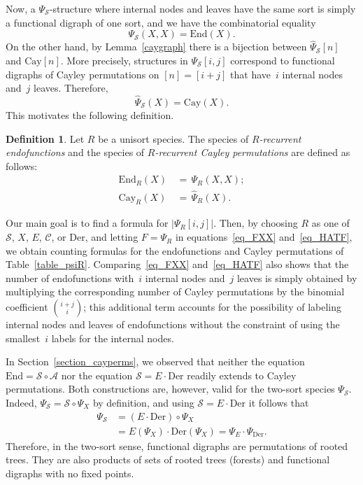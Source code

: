 \documentclass[a4paper,11pt,UKenglish]{article}
\newcommand{\Set}{E}
\newcommand{\Sym}{\mathcal{S}}
\newcommand{\End}{\mathrm{End}}
\newcommand{\Cyc}{\mathcal{C}}
\newcommand{\Der}{\mathrm{Der}}
\newcommand{\rtree}{\mathcal{A}}
\newcommand{\Cay}{\mathrm{Cay}}
\theoremstyle{definition}
\newtheorem{definition}[theorem]{Definition}
\begin{document}
Now, a $\Psi_{\Sym}$-structure where internal nodes and leaves
have the same sort is simply a functional digraph of one sort, and
we have the combinatorial equality
$$
\Psi_{\Sym}(X,X)=\End(X).
$$
On the other hand, by Lemma~\ref{caygraph}
there is a bijection between $\widehat{\Psi}_{\Sym}[n]$
and $\Cay[n]$. More precisely, structures in $\Psi_{\Sym}[i,j]$
correspond to functional digraphs of Cayley permutations on
$[n]=[i+j]$ that have~$i$ internal nodes and~$j$ leaves.
Therefore,
$$
\widehat{\Psi}_{\Sym}(X)=\Cay(X).
$$
This motivates the following definition.
\begin{definition}\label{def_endR_cayR}
  Let $R$ be a unisort species. The species of
  \emph{$R$-recurrent endofunctions} and the species of
  \emph{$R$-recurrent Cayley permutations} are defined as follows:
  \begin{align*}
    \End_R(X) &\,=\, \Psi_R(X,X); \\
    \Cay_R(X) &\,=\, \widehat{\Psi}_R(X).
  \end{align*}
\end{definition}
Our main goal is to find a formula for $|\Psi_R[i,j]|$. Then, by
choosing $R$ as one of $\Sym$, $X$, $\Set$, $\Cyc$, or $\Der$, and letting $F=\Psi_R$
in equations~\eqref{eq_FXX} and~\eqref{eq_HATF}, we obtain
counting formulas for the endofunctions and Cayley permutations
of Table~\ref{table_psiR}.
Comparing~\eqref{eq_FXX} and~\eqref{eq_HATF} also shows that the
number of endofunctions with~$i$ internal nodes and~$j$ leaves is
simply obtained by multiplying the corresponding number of Cayley
permutations by the binomial coefficient $\binom{i+j}{i}$; this
additional term accounts for the possibility of labeling internal
nodes and leaves of endofunctions without the constraint of using
the smallest~$i$ labels for the internal nodes.

In Section~\ref{section_cayperms}, we observed that neither the equation
$\End = \Sym\circ \rtree$ nor the equation $\Sym = \Set\cdot\Der$
readily extends to Cayley permutations. Both constructions are, however,
valid for the two-sort species $\Psi_{\Sym}$. Indeed,
$\Psi_{\Sym}=\Sym\circ \Psi_X$ by definition, and using
$\Sym=\Set\cdot\Der$ it follows that
\begin{align*}
  \Psi_{\Sym} &= (\Set\cdot\Der)\circ\Psi_X \\
             &= \Set(\Psi_X)\cdot\Der(\Psi_X) = \Psi_{\Set}\cdot \Psi_{\Der}.
\end{align*}
Therefore, in the two-sort sense, functional digraphs are permutations
of rooted trees. They are also products of sets of rooted trees (forests)
and functional digraphs with no fixed points.
\end{document}
